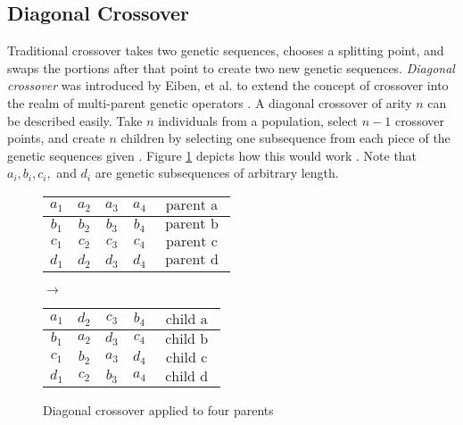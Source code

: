 \subsection*{Diagonal Crossover}
Traditional crossover takes two genetic sequences, chooses a splitting point, and swaps the portions after that point to create two new genetic sequences. \emph{Diagonal crossover} was introduced by Eiben, et al. to extend the concept of crossover into the realm of multi-parent genetic operators \cite{Eiben03}. A diagonal crossover of arity $n$ can be described easily. Take $n$ individuals from a population, select $n-1$ crossover points, and create $n$ children by selecting one subsequence from each piece of the genetic sequences given \cite{Eiben95}. Figure \ref{DC-Fig} depicts how this would work \cite{Eiben95}. Note that $a_i, b_i, c_i,$ and $d_i$ are genetic subsequences of arbitrary length.
\begin{figure}[h!]
\centering
\begin{tabular}{ | c | c | c | c | c | }
\hline
{\color{myred}$a_1$} & {\color{myred}$a_2$} & {\color{myred}$a_3$} & {\color{myred}$a_4$} & $\text{ parent a }$ 	\\ \hline
{\color{myblue}$b_1$} & {\color{myblue}$b_2$} & {\color{myblue}$b_3$} & {\color{myblue}$b_4$} & $\text{ parent b }$ 	\\ \hline
{\color{mygreen}$c_1$} & {\color{mygreen}$c_2$} & {\color{mygreen}$c_3$} & {\color{mygreen}$c_4$} & $\text{ parent c }$ 	\\ \hline
$d_1$ & $d_2$ & $d_3$ & $d_4$ & $\text{ parent d }$ 	\\ \hline
\end{tabular}
$\rightarrow$
\begin{tabular}{ | c | c | c | c | c | }
\hline
{\color{myred}$a_1$} & $d_2$ & {\color{mygreen}$c_3$} & {\color{myblue}$b_4$} & $\text{ child a }$ 	\\ \hline
{\color{myblue}$b_1$} & {\color{myred}$a_2$} & $d_3$ & {\color{mygreen}$c_4$} & $\text{ child b }$ 	\\ \hline
{\color{mygreen}$c_1$} & {\color{myblue}$b_2$} & {\color{myred}$a_3$} & $d_4$ & $\text{ child c }$ 	\\ \hline
$d_1$ & {\color{mygreen}$c_2$} & {\color{myblue}$b_3$} & {\color{myred}$a_4$} & $\text{ child d }$ 	\\ \hline
\end{tabular}
\caption{Diagonal crossover applied to four parents}
\label{DC-Fig}
\end{figure} 

